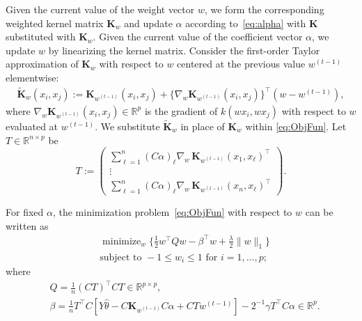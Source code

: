 \documentclass[twoside, onecolumn]{article}
\def\R{\mathbb{R}}
\def\bK{\mathbf{K}}
\def\Score{\widehat{\theta}}
\DeclareMathOperator*{\minimize}{minimize}
\begin{document}
Given the current value of the weight vector $w$, we form the corresponding weighted kernel matrix $\bK_w$ and update $\alpha$ according to~\eqref{eq:alpha} with $\bK$ substituted with $\bK_w$. Given the current value of the coefficient vector $\alpha$, we update $w$ by linearizing the kernel matrix. Consider the first-order Taylor approximation of 
$\mathbf{K}_{w}$ with respect to $w$ centered at the previous value $w^{(t-1)}$ elementwise: 
\begin{align*}
\widetilde{\mathbf{K}}_{w}(x_i,x_j):=\mathbf{K}_{w^{(t-1)}}(x_i, x_j)+\{\nabla_{w}\mathbf{K}_{w^{(t-1)}}(x_i, x_j)\}^{\top}(w-w^{(t-1)}),
\end{align*}
where $\nabla_w\mathbf{K}_{w^{(t-1)}}(x_i, x_j)\in \R^p$ is the gradient of $k(wx_i, wx_j)$ with respect to $w$ evaluated at $w^{(t-1)}$. We substitute $\widetilde{\mathbf{K}}_{w}$ in place of $\mathbf{K}_{w}$ within \eqref{eq:ObjFun}.
Let $T\in \R^{n\times p}$ be
$$
T :=
\begin{pmatrix}
\sum_{\ell=1}^{n}(C\alpha)_{\ell}\nabla_{w}\, \mathbf{K}_{w^{(t-1)}}(x_1, x_\ell)^{\top}\\
\vdots\\
\sum_{\ell=1}^{n}(C\alpha)_{\ell}\nabla_{w}\, \mathbf{K}_{w^{(t-1)}}(x_n, x_\ell)^{\top}
\end{pmatrix}.
$$

For fixed $\alpha$, the minimization problem~\eqref{eq:ObjFun} with respect to $w$ can be written as
\begin{equation}
\begin{split}\label{eq:wlasso}
&\minimize_{w} \bigg\{\frac{1}{2}w^{\top}Qw-\beta^{\top}w+ \frac{\lambda}{2}\|w\|_{1}\bigg\}\\
&\text{subject to }-1\leq w_i\leq 1\text{ for }i=1, \dots, p;
\end{split}
\end{equation}
where 
\begin{equation}\label{eq:QandB}
\begin{split}
&Q=\frac{1}{n}(CT)^{\top}CT \in \R^{p\times p},\\
&\beta=\frac{1}{n}T^{\top}C
[Y\Score-C\mathbf{K}_{w^{(t-1)}}C\alpha+CTw^{(t-1)}]-2^{-1}\gamma T^{\top}C\alpha\in \mathbb{R}^{p}.
\end{split}
\end{equation}
\end{document}
